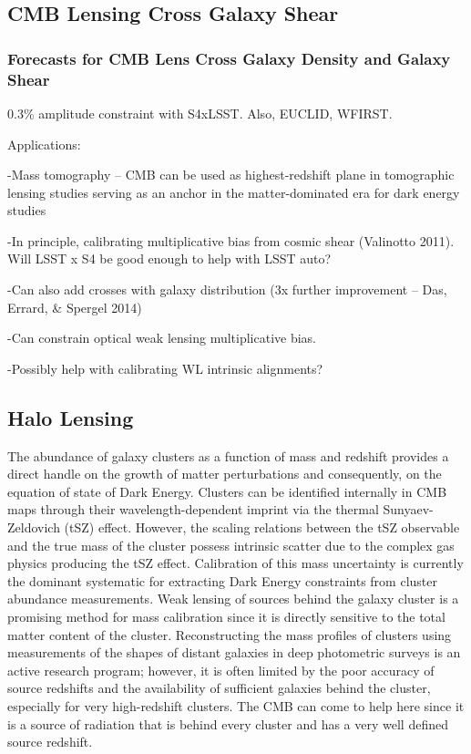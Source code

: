 \subsection{CMB Lensing Cross Galaxy Shear}



\subsubsection{Forecasts for CMB Lens Cross Galaxy Density and Galaxy Shear}\label{crossForecast}

0.3\% amplitude constraint with S4xLSST.  Also, EUCLID, WFIRST.

Applications:

-Mass tomography -- CMB can be used as highest-redshift plane in tomographic lensing studies serving as an anchor in the matter-dominated era for dark energy studies

-In principle, calibrating multiplicative bias from cosmic shear (Valinotto 2011).  Will LSST x S4 be good enough to help with LSST auto?

-Can also add crosses with galaxy distribution (3x further improvement -- Das, Errard, \& Spergel 2014)

-Can constrain optical weak lensing multiplicative bias.

-Possibly help with calibrating WL intrinsic alignments?

\subsection{Halo Lensing}


The abundance of galaxy clusters as a function of mass and redshift provides a direct handle on the growth of matter perturbations and consequently, on the equation of state of Dark Energy. Clusters can be identified internally in CMB maps through their wavelength-dependent imprint via the thermal Sunyaev-Zeldovich (tSZ) effect. However, the scaling relations between the tSZ observable and the true mass of the cluster possess intrinsic scatter due to the complex gas physics producing the tSZ effect. Calibration of this mass uncertainty is currently the dominant systematic for extracting Dark Energy constraints from cluster abundance measurements. Weak lensing of sources behind the galaxy cluster is a promising method for mass calibration since it is directly sensitive to the total matter content of the cluster. Reconstructing the mass profiles of clusters using measurements of the shapes of distant galaxies in deep photometric surveys is an active research program; however, it is often limited by the poor accuracy of source redshifts and the availability of sufficient galaxies behind the cluster, especially for very high-redshift clusters. The CMB can come to help here since it is a source of radiation that is behind every cluster and has a very well defined source redshift.

